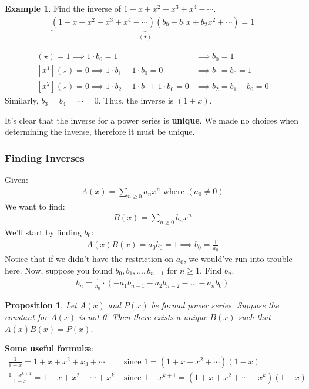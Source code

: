 \documentclass[]{article}
\newtheorem*{proposition}{Proposition}
\theoremstyle{definition}
\newtheorem{ex}{Example}[section]
\newcommand{\lecture}[1]{\marginpar{{\footnotesize $\leftarrow$ \underline{#1}}}}
\begin{document}
			\begin{ex}
				Find the inverse of $1 - x + x^2 - x^3 + x^4 - \cdots$.
				\begin{align*}
					\underbrace{(1 - x + x^2 - x^3 + x^4 - \cdots)(b_0 + b_1x + b_2x^2 + \cdots)}_{(\star)} = 1
				\end{align*}
				
				\begin{align*}
					[x^0](\star) = 1 \implies 1 \cdot b_0 = 1 &\implies b_0 = 1 \\
					[x^1](\star) = 0 \implies 1 \cdot b_1 - 1 \cdot b_0 = 0 &\implies b_1 = b_0 = 1 \\
					[x^2](\star) = 0 \implies 1 \cdot b_2 - 1 \cdot b_1 + 1 \cdot b_0 = 0 &\implies b_2 = b_1 - b_0 = 0
				\end{align*}
				Similarly, $b_3 = b_4 = \cdots = 0$. Thus, the inverse is $(1 + x)$.
			\end{ex}

			It's clear that the inverse for a power series is \textbf{unique}. We made no choices when determining the inverse, therefore it must be unique.
			\subsubsection{Finding Inverses} \lecture{January 16, 2013}
				Given:
				\begin{align*}
					A(x) = \sum_{n \ge 0} a_nx^n \text{ where } (a_0 \ne 0)
				\end{align*}
				We want to find:
				\begin{align*}
					B(x) = \sum_{n \ge 0} b_nx^n
				\end{align*}
				We'll start by finding $b_0$:
				\begin{align*}
					[x^0]A(x)B(x) = a_0b_0 = 1 \implies b_0 = \frac{1}{a_0}
				\end{align*}
				Notice that if we didn't have the restriction on $a_0$, we would've run into trouble here. Now, suppose you found $b_0, b_1, \ldots, b_{n - 1}$ for $n \ge 1$. Find $b_n$.
				\begin{align*}
					b_n = \frac{1}{a_0} \cdot (-a_1b_{n - 1} - a_2b_{n - 2} - \ldots - a_nb_0)
				\end{align*}

				\begin{proposition}
					Let $A(x)$ and $P(x)$ be formal power series.
					Suppose the constant for $A(x)$ is not 0. Then there exists a unique $B(x)$ such that $A(x)B(x) = P(x)$.
				\end{proposition}
				\textbf{Some useful formul\ae}:
					\begin{align*}
						\frac{1}{1 - x} = 1 + x + x^2 + x_3 + \cdots &\text{ since } 1 = (1 + x + x^2 + \cdots)(1 - x) \\
						\frac{1 - x^{k+1}}{1-x} = 1 + x + x^2 + \cdots + x^k &\text{ since } 1 - x^{k+1} = (1 + x + x^2 + \cdots + x^k)(1-x) 
					\end{align*}
\end{document}
